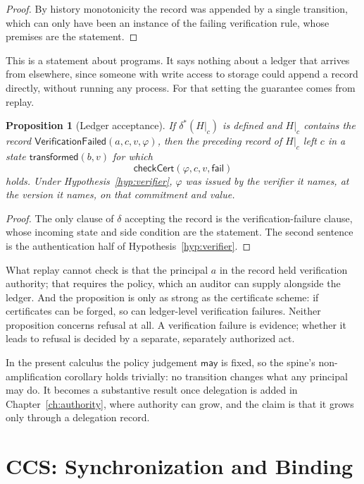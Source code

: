 \documentclass[11pt,openany]{book}
\newtheorem{proposition}[theorem]{Proposition}
\theoremstyle{remark}
\begin{document}
\begin{proof}
By history monotonicity the record was appended by a single transition,
which can only have been an instance of the failing verification rule,
whose premises are the statement.
\end{proof}

This is a statement about programs. It says nothing about a ledger that
arrives from elsewhere, since someone with write access to storage could
append a record directly, without running any process. For that setting
the guarantee comes from replay.

\begin{proposition}[Ledger acceptance]\label{prop:vf-ledger}
If $\delta^{*}(H|_c)$ is defined and $H|_c$ contains the record
$\mathsf{VerificationFailed}(a,c,v,\varphi)$, then the preceding record
of $H|_c$ left $c$ in a state $\mathsf{transformed}(b,v)$ for which
\[
\mathsf{checkCert}(\varphi,c,v,\mathsf{fail})
\]
holds. Under Hypothesis~\ref{hyp:verifier}, $\varphi$ was issued by the
verifier it names, at the version it names, on that commitment and value.
\end{proposition}

\begin{proof}
The only clause of $\delta$ accepting the record is the
verification-failure clause, whose incoming state and side condition are
the statement. The second sentence is the authentication half of
Hypothesis~\ref{hyp:verifier}.
\end{proof}

What replay cannot check is that the principal $a$ in the record held
verification authority; that requires the policy, which an auditor can
supply alongside the ledger. And the proposition is only as strong as the
certificate scheme: if certificates can be forged, so can ledger-level
verification failures. Neither proposition concerns refusal at all. A
verification failure is evidence; whether it leads to refusal is decided
by a separate, separately authorized act.

In the present calculus the policy judgement $\mathsf{may}$ is fixed, so
the spine's non-amplification corollary holds trivially: no transition
changes what any principal may do. It becomes a substantive result once
delegation is added in Chapter~\ref{ch:authority}, where authority can grow, and the claim
is that it grows only through a delegation record.

\chapter{CCS: Synchronization and Binding}
\label{ch:ccs}
\end{document}
